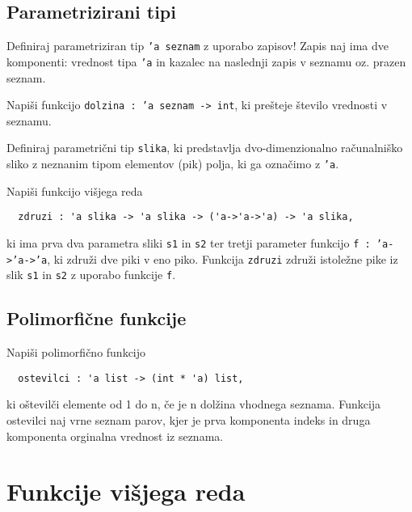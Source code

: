 \subsection{Parametrizirani tipi}

\begin{ex}
  Definiraj parametriziran tip \texttt{'a seznam} z uporabo zapisov!
  Zapis naj ima dve komponenti: vrednost tipa \texttt{'a} in kazalec na
  naslednji zapis v seznamu oz. prazen seznam.

  Napi\v si funkcijo \texttt{dolzina : 'a seznam -> int}, ki
  pre\v steje \v stevilo vrednosti v seznamu.


\end{ex} 
\begin{ex}
  Definiraj parametri\v cni tip \texttt{slika}, ki predstavlja
  dvo-dimenzionalno ra\v cunalni\v sko sliko z neznanim tipom
  elementov (pik) polja, ki ga ozna\v cimo z \texttt{'a}.

  Napi\v si funkcijo vi\v sjega reda

  \begin{verbatim}
  zdruzi : 'a slika -> 'a slika -> ('a->'a->'a) -> 'a slika,
  \end{verbatim}

  ki ima prva dva parametra sliki \texttt{s1} in \texttt{s2} ter
  tretji parameter funkcijo \texttt{f : 'a->'a->'a}, ki zdru\v zi dve
  piki v eno piko. Funkcija \texttt{zdruzi} zdru\v zi istole\v zne
  pike iz slik \texttt{s1} in \texttt{s2} z uporabo funkcije
  \texttt{f}.


\end{ex} 

\subsection{Polimorfične funkcije}

\begin{ex}
  Napi\v si polimorfi\v cno funkcijo
  \begin{verbatim}
  ostevilci : 'a list -> (int * 'a) list, 
  \end{verbatim}
  ki o\v stevil\v ci elemente od 1 do n, \v ce je n dol\v zina
  vhodnega seznama. Funkcija ostevilci naj vrne seznam parov, kjer je
  prva komponenta indeks in druga komponenta orginalna vrednost iz
  seznama.

\end{ex} 

\section{Funkcije vi\v sjega reda}

